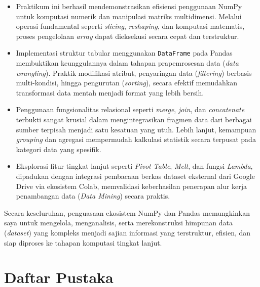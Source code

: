 \documentclass[a4paper,oneside,11pt]{book}
\begin{document}
\begin{itemize}
    \item Praktikum ini berhasil mendemonstrasikan efisiensi penggunaan NumPy untuk komputasi numerik dan manipulasi matriks multidimensi. Melalui operasi fundamental seperti \textit{slicing}, \textit{reshaping}, dan komputasi matematis, proses pengelolaan \textit{array} dapat dieksekusi secara cepat dan terstruktur.
    
    \item Implementasi struktur tabular menggunakan \texttt{DataFrame} pada Pandas membuktikan keunggulannya dalam tahapan prapemrosesan data (\textit{data wrangling}). Praktik modifikasi atribut, penyaringan data (\textit{filtering}) berbasis multi-kondisi, hingga pengurutan (\textit{sorting}), secara efektif memudahkan transformasi data mentah menjadi format yang lebih bersih.
    
    \item Penggunaan fungsionalitas relasional seperti \textit{merge}, \textit{join}, dan \textit{concatenate} terbukti sangat krusial dalam mengintegrasikan fragmen data dari berbagai sumber terpisah menjadi satu kesatuan yang utuh. Lebih lanjut, kemampuan \textit{grouping} dan agregasi mempermudah kalkulasi statistik secara terpusat pada kategori data yang spesifik.
    
    \item Eksplorasi fitur tingkat lanjut seperti \textit{Pivot Table}, \textit{Melt}, dan fungsi \textit{Lambda}, dipadukan dengan integrasi pembacaan berkas dataset eksternal dari Google Drive via ekosistem Colab, memvalidasi keberhasilan penerapan alur kerja penambangan data (\textit{Data Mining}) secara praktis.
\end{itemize}

Secara keseluruhan, penguasaan ekosistem NumPy dan Pandas memungkinkan saya untuk mengelola, menganalisis, serta merekonstruksi himpunan data (\textit{dataset}) yang kompleks menjadi sajian informasi yang terstruktur, efisien, dan siap diproses ke tahapan komputasi tingkat lanjut.

\chapter{Daftar Pustaka}
\end{document}
